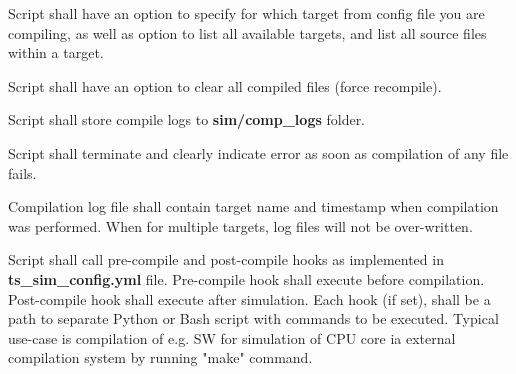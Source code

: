 \documentclass{tropic_design_spec}
\begin{document}

    {Script shall have an option to specify for which target from config file you are
     compiling, as well as option to list all available targets, and list all source files
     within a target.}


    {Script shall have an option to clear all compiled files (force recompile).}


    {Script shall store compile logs to \textbf{sim/comp_logs} folder.}
			

    {Script shall terminate and clearly indicate error as soon as compilation of any file
     fails.}


    {Compilation log file shall contain target name and timestamp when compilation was
     performed. When for multiple targets, log files will not be over-written.}


    {Script shall call pre-compile and post-compile hooks as implemented in 
     \textbf{ts_sim_config.yml} file. Pre-compile hook shall execute before compilation.
     Post-compile hook shall execute after simulation. Each hook (if set), shall be a
     path to separate Python or Bash script with commands to be executed. Typical
     use-case is compilation of e.g. SW for simulation of CPU core ia external
     compilation system by running "make" command.}


\ReqEnd


\pagebreak
\end{document}
